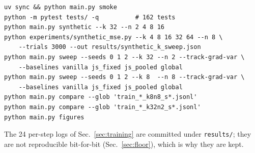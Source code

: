 \documentclass{article}
\begin{document}
\begin{verbatim}
uv sync && python main.py smoke
python -m pytest tests/ -q          # 162 tests
python main.py synthetic --k 32 --n 2 4 8 16
python experiments/synthetic_mse.py --k 4 8 16 32 64 --n 8 \
    --trials 3000 --out results/synthetic_k_sweep.json
python main.py sweep --seeds 0 1 2 --k 32 --n 2 --track-grad-var \
    --baselines vanilla js_fixed js_pooled global
python main.py sweep --seeds 0 1 2 --k 8  --n 8 --track-grad-var \
    --baselines vanilla js_fixed js_pooled global
python main.py compare --glob 'train_*_k8n8_s*.jsonl'
python main.py compare --glob 'train_*_k32n2_s*.jsonl'
python main.py figures
\end{verbatim}

The 24 per-step logs of Sec.~\ref{sec:training} are committed under
\texttt{results/}; they are not reproducible bit-for-bit
(Sec.~\ref{sec:floor}), which is why they are kept.
\end{document}

